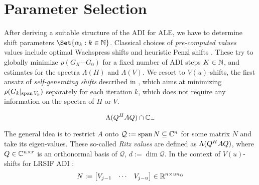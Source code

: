 \section{Parameter Selection}
\label{sec:adi:parameters}

After deriving a suitable structure of the \ac{ADI} for \ac{ALE},
we have to determine shift parameters $\Set{\alpha_k : k\in\N}$.
Classical choices of \emph{pre-computed values} values include
optimal Wachspress shifts \cite{Wachspress1992,Wachspress2013} and
heuristic Penzl shifts \cite{Penzl1999}.
These try to globally minimize $\rho(G_K \cdots G_0)$ for a fixed number of \ac{ADI} steps $K\in\mathbb{N}$,
and estimates for the spectra $\Lambda(H)$ and $\Lambda(V)$.
We resort to $V(u)$-shifts, the first ansatz of \emph{self-generating shifts} described in \cite[Section~5.3]{Kuerschner2016},
which aims at minimizing
$\rho(G_k |_{\operatorname{span} V_k})$
separately for each iteration $k$,
which does not require any information on the spectra of $H$ or $V$.


\begin{equation*}
  \Lambda(Q^H A Q) \cap \mathbb{C}_-
\end{equation*}

The general idea is to restrict $A$ onto
$\mathcal Q := \operatorname{span} N \subseteq \mathbb{C}^n$
for some matrix $N$ and take its eigen-values.
These so-called \emph{Ritz values} are defined as $\Lambda(Q^H A Q)$,
where $Q\in\mathbb{C}^{n\times r}$ is an orthonormal basis of $\mathcal Q$, $d := \dim\mathcal Q$.
In the context of $V(u)$-shifts for \ac{LRSIF} \ac{ADI} \cite{Lang2015}:
\begin{equation}
  N := \begin{bmatrix}
    V_{j-1} &
    \cdots &
    V_{j-u}
  \end{bmatrix}
  \in \mathbb{R}^{n\times u n_G}
\end{equation}

